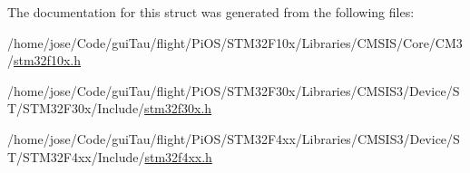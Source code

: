 The documentation for this struct was generated from the following files\-:\begin{DoxyCompactItemize}
\item 
/home/jose/\-Code/gui\-Tau/flight/\-Pi\-O\-S/\-S\-T\-M32\-F10x/\-Libraries/\-C\-M\-S\-I\-S/\-Core/\-C\-M3/\hyperlink{stm32f10x_8h}{stm32f10x.\-h}\item 
/home/jose/\-Code/gui\-Tau/flight/\-Pi\-O\-S/\-S\-T\-M32\-F30x/\-Libraries/\-C\-M\-S\-I\-S3/\-Device/\-S\-T/\-S\-T\-M32\-F30x/\-Include/\hyperlink{stm32f30x_8h}{stm32f30x.\-h}\item 
/home/jose/\-Code/gui\-Tau/flight/\-Pi\-O\-S/\-S\-T\-M32\-F4xx/\-Libraries/\-C\-M\-S\-I\-S3/\-Device/\-S\-T/\-S\-T\-M32\-F4xx/\-Include/\hyperlink{stm32f4xx_8h}{stm32f4xx.\-h}\end{DoxyCompactItemize}
